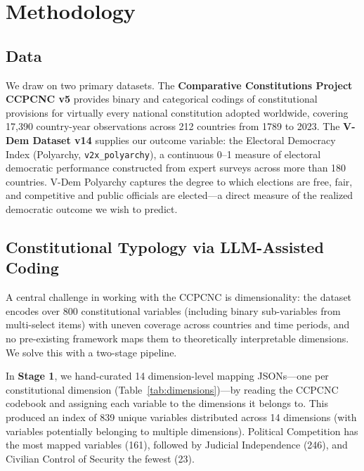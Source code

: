 \documentclass[9pt,twoside]{pnas-new}
\begin{document}
\section*{Methodology}

\subsection*{Data}

We draw on two primary datasets. The \textbf{Comparative Constitutions Project CCPCNC v5} \cite{elkins_ginsburg_melton_ccpc} provides binary and categorical codings of constitutional provisions for virtually every national constitution adopted worldwide, covering 17,390 country-year observations across 212 countries from 1789 to 2023. The \textbf{V-Dem Dataset v14} \cite{placeholder_vdem} supplies our outcome variable: the Electoral Democracy Index (Polyarchy, \texttt{v2x\_polyarchy}), a continuous 0--1 measure of electoral democratic performance constructed from expert surveys across more than 180 countries. V-Dem Polyarchy captures the degree to which elections are free, fair, and competitive and public officials are elected---a direct measure of the realized democratic outcome we wish to predict.

\subsection*{Constitutional Typology via LLM-Assisted Coding}

A central challenge in working with the CCPCNC is dimensionality: the dataset encodes over 800 constitutional variables (including binary sub-variables from multi-select items) with uneven coverage across countries and time periods, and no pre-existing framework maps them to theoretically interpretable dimensions. We solve this with a two-stage pipeline.

In \textbf{Stage 1}, we hand-curated 14 dimension-level mapping JSONs---one per constitutional dimension (Table~\ref{tab:dimensions})---by reading the CCPCNC codebook and assigning each variable to the dimensions it belongs to. This produced an index of 839 unique variables distributed across 14 dimensions (with variables potentially belonging to multiple dimensions). Political Competition has the most mapped variables (161), followed by Judicial Independence (246), and Civilian Control of Security the fewest (23).
\end{document}
